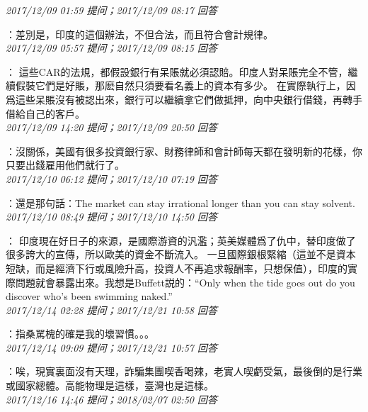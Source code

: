 \documentclass[twocolumn]{ctexart}
\begin{document}
\textit{\hfill\noindent\small 2017/12/09 01:59 提问；2017/12/09 08:17 回答}

：差別是，印度的這個辦法，不但合法，而且符合會計規律。
\\

\textit{\hfill\noindent\small 2017/12/09 05:57 提问；2017/12/09 08:15 回答}

：
這些CAR的法規，都假設銀行有呆賬就必須認賠。印度人對呆賬完全不管，繼續假裝它們是好賬，那麽自然只須要看名義上的資本有多少。
在實際執行上，因爲這些呆賬沒有被認出來，銀行可以繼續拿它們做抵押，向中央銀行借錢，再轉手借給自己的客戶。
\\

\textit{\hfill\noindent\small 2017/12/09 14:20 提问；2017/12/09 20:50 回答}

：沒關係，美國有很多投資銀行家、財務律師和會計師每天都在發明新的花樣，你只要出錢雇用他們就行了。
\\

\textit{\hfill\noindent\small 2017/12/10 06:12 提问；2017/12/10 07:19 回答}

：還是那句話：The market can stay irrational longer than you can stay solvent.
\\

\textit{\hfill\noindent\small 2017/12/10 08:49 提问；2017/12/10 14:50 回答}

：
印度現在好日子的來源，是國際游資的汎濫；英美媒體爲了仇中，替印度做了很多誇大的宣傳，所以歐美的資金不斷流入。
一旦國際銀根緊縮（這並不是資本短缺，而是經濟下行或風險升高，投資人不再追求報酬率，只想保值），印度的實際問題就會暴露出來。我想是Buffett説的：“Only when the tide goes out do you discover who's been swimming naked.”
\\

\textit{\hfill\noindent\small 2017/12/14 02:28 提问；2017/12/21 10:58 回答}

：指桑駡槐的確是我的壞習慣。。。
\\

\textit{\hfill\noindent\small 2017/12/14 09:09 提问；2017/12/21 10:57 回答}

：唉，現實裏面沒有天理，詐騙集團喫香喝辣，老實人喫虧受氣，最後倒的是行業或國家總體。高能物理是這樣，臺灣也是這樣。
\\

\textit{\hfill\noindent\small 2017/12/16 14:46 提问；2018/02/07 02:50 回答}
\end{document}
